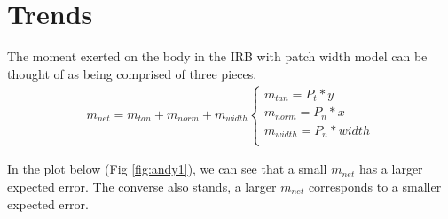 \documentclass{article}
\begin{document}
\section{Trends}
The moment exerted on the body in the IRB with patch width model can be thought of as being comprised of three pieces. 
\begin{align}
    m_{net} = m_{tan} + m_{norm} + m_{width}
     \begin{cases}
       m_{tan} = P_t * y\\
       m_{norm} = P_n * x\\
       m_{width} = P_n * width\\
    \end{cases} 
\end{align}
 
 \noindent In the plot below (Fig \ref{fig:andy1}), we can see that a small $m_{net}$ has a larger expected error. The converse also stands, a larger $m_{net}$ corresponds to a smaller expected error. 
\end{document}
